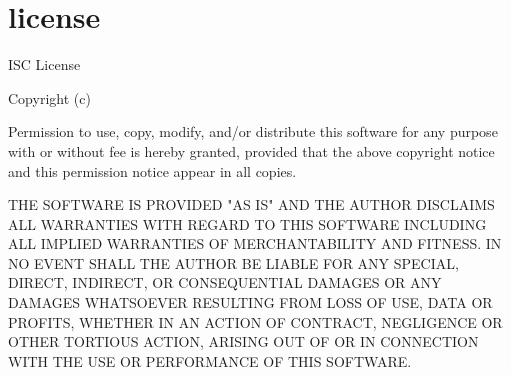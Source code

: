 \chapter{license}
\hypertarget{md_pkiclassroomrescheduler_2src_2main_2frontend_2node__modules_2css-declaration-sorter_2license}{}\label{md_pkiclassroomrescheduler_2src_2main_2frontend_2node__modules_2css-declaration-sorter_2license}
ISC License

Copyright (c)

Permission to use, copy, modify, and/or distribute this software for any purpose with or without fee is hereby granted, provided that the above copyright notice and this permission notice appear in all copies.

THE SOFTWARE IS PROVIDED "{}\+AS IS"{} AND THE AUTHOR DISCLAIMS ALL WARRANTIES WITH REGARD TO THIS SOFTWARE INCLUDING ALL IMPLIED WARRANTIES OF MERCHANTABILITY AND FITNESS. IN NO EVENT SHALL THE AUTHOR BE LIABLE FOR ANY SPECIAL, DIRECT, INDIRECT, OR CONSEQUENTIAL DAMAGES OR ANY DAMAGES WHATSOEVER RESULTING FROM LOSS OF USE, DATA OR PROFITS, WHETHER IN AN ACTION OF CONTRACT, NEGLIGENCE OR OTHER TORTIOUS ACTION, ARISING OUT OF OR IN CONNECTION WITH THE USE OR PERFORMANCE OF THIS SOFTWARE. 